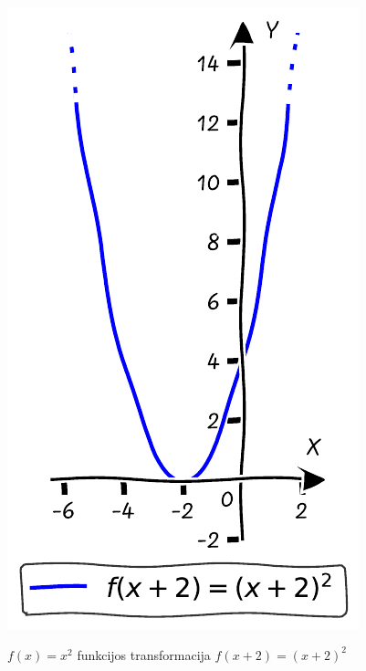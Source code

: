 \documentclass[nobib]{tufte-handout}
\begin{document}
\begin{marginfigure}%

  \includegraphics[width=\linewidth]{./graphs/quadratic_func_transform_lshifted_2.pdf}
  \caption{$f(x)=x^2$ funkcijos transformacija $f(x+2)=(x+2)^2$}
  \label{fig:quadratic_func_transform_lshifted_2}
\end{marginfigure}
\end{document}
